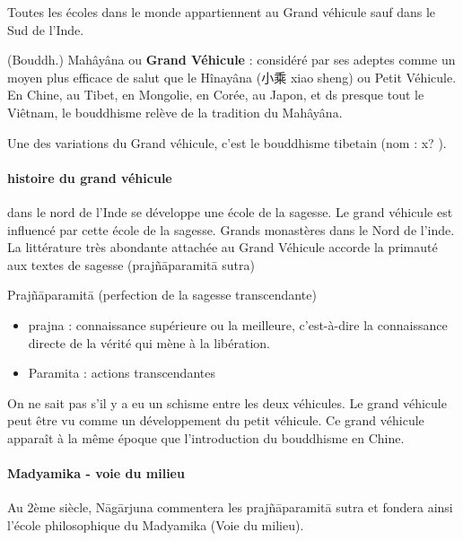 Toutes les écoles dans le monde appartiennent au Grand véhicule sauf dans le Sud de l'Inde. 

\begin{Def}[dasheng 大乘]
    (Bouddh.) Mahâyâna ou \textbf{Grand Véhicule} : considéré par ses adeptes comme un moyen plus efficace de salut que le Hînayâna (小乘 xiao sheng) ou Petit Véhicule. En Chine, au Tibet, en Mongolie, en Corée, au Japon, et ds presque tout le Viêtnam, le bouddhisme relève de la tradition du Mahâyâna.

    Une des variations du Grand véhicule, c'est le bouddhisme tibetain (nom : x? ).
\end{Def}

\paragraph{histoire du grand véhicule} dans le nord de l'Inde se développe une école de la sagesse. Le grand véhicule est influencé par cette école de la sagesse. Grands monastères dans le Nord de l'inde.
La littérature très abondante attachée au Grand Véhicule accorde la primauté aux textes de sagesse (prajñāparamitā sutra)

 


\begin{Def}[Prajñāparamitā]
    Prajñāparamitā (perfection de la sagesse transcendante)

    \begin{itemize}
        \item  	prajna : connaissance supérieure ou la meilleure, c’est-à-dire la connaissance directe de la vérité qui mène à la libération.
\item 	Paramita : actions transcendantes
    \end{itemize}

\end{Def}

On ne sait pas s'il y a eu un schisme entre les deux véhicules. Le grand véhicule peut être vu comme un développement du petit véhicule.
Ce grand véhicule apparaît à la même époque que l'introduction du bouddhisme en Chine. 

\paragraph{Madyamika - voie du milieu} 	Au 2ème siècle, Nāgārjuna commentera les prajñāparamitā sutra et fondera ainsi l’école philosophique du Madyamika (Voie du milieu).

